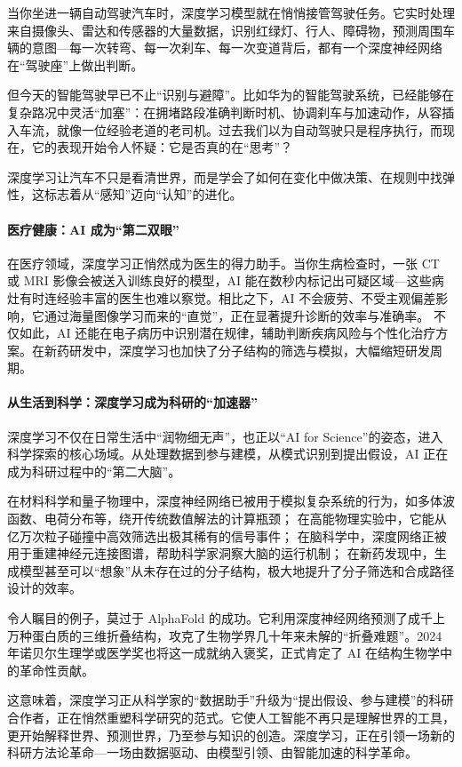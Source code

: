 当你坐进一辆自动驾驶汽车时，深度学习模型就在悄悄接管驾驶任务。它实时处理来自摄像头、雷达和传感器的大量数据，识别红绿灯、行人、障碍物，预测周围车辆的意图---每一次转弯、每一次刹车、每一次变道背后，都有一个深度神经网络在“驾驶座”上做出判断。

但今天的智能驾驶早已不止“识别与避障”。比如华为的智能驾驶系统，已经能够在复杂路况中灵活“加塞”：在拥堵路段准确判断时机、协调刹车与加速动作，从容插入车流，就像一位经验老道的老司机。过去我们以为自动驾驶只是程序执行，而现在，它的表现开始令人怀疑：它是否真的在“思考”？

深度学习让汽车不只是看清世界，而是学会了如何在变化中做决策、在规则中找弹性，这标志着从“感知”迈向“认知”的进化。
    
\paragraph{医疗健康：AI 成为“第二双眼”}
    
在医疗领域，深度学习正悄然成为医生的得力助手。当你生病检查时，一张 CT 或 MRI 影像会被送入训练良好的模型，AI 能在数秒内标记出可疑区域---这些病灶有时连经验丰富的医生也难以察觉。相比之下，AI 不会疲劳、不受主观偏差影响，它通过海量图像学习而来的“直觉”，正在显著提升诊断的效率与准确率。
不仅如此，AI 还能在电子病历中识别潜在规律，辅助判断疾病风险与个性化治疗方案。在新药研发中，深度学习也加快了分子结构的筛选与模拟，大幅缩短研发周期。

\paragraph{从生活到科学：深度学习成为科研的“加速器”}  
深度学习不仅在日常生活中“润物细无声”，也正以“AI for Science”的姿态，进入科学探索的核心场域。从处理数据到参与建模，从模式识别到提出假设，AI 正在成为科研过程中的“第二大脑”。

在材料科学和量子物理中，深度神经网络已被用于模拟复杂系统的行为，如多体波函数、电荷分布等，绕开传统数值解法的计算瓶颈；
在高能物理实验中，它能从亿万次粒子碰撞中高效筛选出极其稀有的信号事件；
在脑科学中，深度网络正被用于重建神经元连接图谱，帮助科学家洞察大脑的运行机制；
在新药发现中，生成模型甚至可以“想象”从未存在过的分子结构，极大地提升了分子筛选和合成路径设计的效率。

令人瞩目的例子，莫过于 AlphaFold 的成功。它利用深度神经网络预测了成千上万种蛋白质的三维折叠结构，攻克了生物学界几十年来未解的“折叠难题”。2024 年诺贝尔生理学或医学奖也将这一成就纳入褒奖，正式肯定了 AI 在结构生物学中的革命性贡献。

这意味着，深度学习正从科学家的“数据助手”升级为“提出假设、参与建模”的科研合作者，正在悄然重塑科学研究的范式。它使人工智能不再只是理解世界的工具，更开始解释世界、预测世界，乃至参与知识的创造。深度学习，正在引领一场新的科研方法论革命---一场由数据驱动、由模型引领、由智能加速的科学革命。

